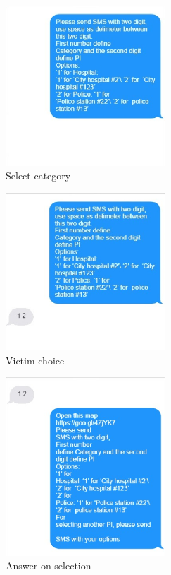 \begin{figure}
  \centering
    \includegraphics[width=6cm]{images/mockups/feature3-PI/iCrashSendsOptions.eps}
  \caption{Select category}
  \label{fig:Selectcategory}
\end{figure}


\begin{figure}
  \centering
    \includegraphics[width=6cm]{images/mockups/feature3-PI/UserSelectedOption.eps}
  \caption{Victim choice}
  \label{fig:Victimchoice}
\end{figure}  


\begin{figure}
  \centering
    \includegraphics[width=6cm]{images/mockups/feature3-PI/iCrashRequest.eps}
  \caption{Answer on selection}
  \label{fig:Answeronselection}
\end{figure}

